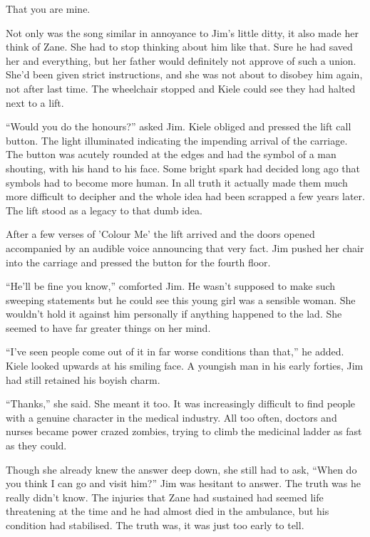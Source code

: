 That you are mine.  



Not only was the song similar in annoyance to Jim's little ditty, it also made her think of Zane.  She had to stop thinking about him like that.  Sure he had saved her and everything, but her father would definitely not approve of such a union.  She'd been given strict instructions, and she was not about to disobey him again, not after last time.  The wheelchair stopped and Kiele could see they had halted next to a lift.  

``Would you do the honours?'' asked Jim.  Kiele obliged and pressed the lift call button.  The light illuminated indicating the impending arrival of the carriage.  The button was acutely rounded at the edges and had the symbol of a man shouting, with his hand to his face.  Some bright spark had decided long ago that symbols had to become more human.  In all truth it actually made them much more difficult to decipher and the whole idea had been scrapped a few years later.  The lift stood as a legacy to that dumb idea.

After a few verses of 'Colour Me' the lift arrived and the doors opened accompanied by an audible voice announcing that very fact.  Jim pushed her chair into the carriage and pressed the button for the fourth floor.

``He'll be fine you know,'' comforted Jim.  He wasn't supposed to make such sweeping statements but he could see this young girl was a sensible woman.  She wouldn't hold it against him personally if anything happened to the lad.  She seemed to have far greater things on her mind.  

``I've seen people come out of it in far worse conditions than that,'' he added.  Kiele looked upwards at his smiling face.  A youngish man in his early forties, Jim had still retained his boyish charm.

``Thanks,'' she said.  She meant it too.  It was increasingly difficult to find people with a genuine character in the medical industry.  All too often, doctors and nurses became power crazed zombies, trying to climb the medicinal ladder as fast as they could.  

Though she already knew the answer deep down, she still had to ask, ``When do you think I can go and visit him?''  Jim was hesitant to answer.  The truth was he really didn't know.  The injuries that Zane had sustained had seemed life threatening at the time and he had almost died in the ambulance, but his condition had stabilised.  The truth was, it was just too early to tell.

